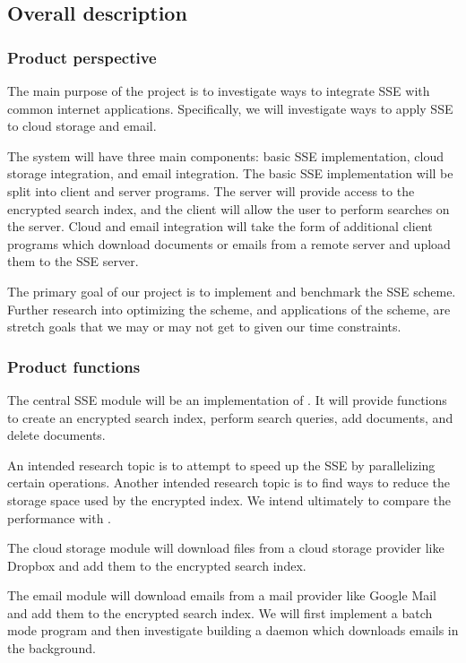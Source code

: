\subsection{ Overall description }
\subsubsection{ Product perspective }

The main purpose of the project is to investigate ways to integrate SSE with common internet applications.
Specifically, we will investigate ways to apply SSE to cloud storage and email.

The system will have three main components: basic SSE implementation, cloud storage integration, and email integration. The basic SSE implementation will be split into client and server programs. The server will provide access to the encrypted search index, and the client will allow the user to perform searches on the server. Cloud and email integration will take the form of additional client programs which download documents or emails from a remote server and upload them to the SSE server.

The primary goal of our project is to implement and benchmark the SSE scheme.
Further research into optimizing the scheme, and applications of the scheme, are stretch goals that we may or may not get to given our time constraints.

\subsubsection{ Product functions }

The central SSE module will be an implementation of \cite{cash14}. It will provide functions to create an encrypted search index, perform search queries, add documents, and delete documents.

An intended research topic is to attempt to speed up the SSE by parallelizing certain operations. 
Another intended research topic is to find ways to reduce the storage space used by the encrypted index.
We intend ultimately to compare the performance with \cite{yavuz15}.

The cloud storage module will download files from a cloud storage provider like Dropbox and add them to the encrypted search index.

The email module will download emails from a mail provider like Google Mail and add them to the encrypted search index. We will first implement a batch mode program and then investigate building a daemon which downloads emails in the background.


